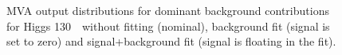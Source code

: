 \begin{figure}[!hbtp]
\caption{
MVA output distributions for dominant background contributions for
Higgs 130~\GeV\ without fitting (nominal), background fit (signal is
set to zero) and signal+background fit (signal is floating in the
fit).}
\label{fig:bdt2_130}
\end{figure}

